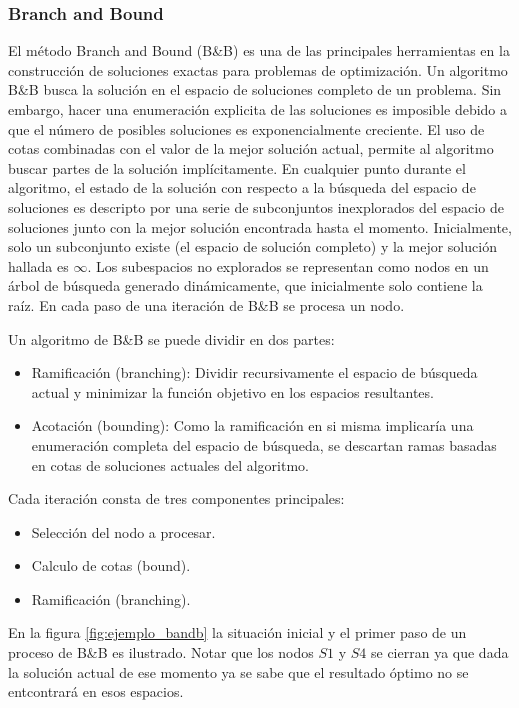 \documentclass[10pt, a4paper]{article}
\theoremstyle{definition}
\begin{document}
\subsubsection{Branch and Bound}
El método Branch and Bound (B\&B) es una de las principales herramientas en la construcción de soluciones exactas para problemas de optimización.
Un algoritmo B\&B busca la solución en el espacio de soluciones completo de un problema.
Sin embargo, hacer una enumeración explicita de las soluciones es imposible debido a que el número de posibles soluciones es exponencialmente creciente.
El uso de cotas combinadas con el valor de la mejor solución actual, permite al algoritmo buscar partes de la solución implícitamente.
En cualquier punto durante el algoritmo, el estado de la solución con respecto a la búsqueda del espacio de soluciones es descripto por una serie de subconjuntos inexplorados del espacio de soluciones junto con la mejor solución encontrada hasta el momento.
Inicialmente, solo un subconjunto existe (el espacio de solución completo) y la mejor solución hallada es $\infty$. 
Los subespacios no explorados se representan como nodos en un árbol de búsqueda generado dinámicamente, que inicialmente solo contiene la raíz. 
En cada paso de una iteración de B\&B se procesa un nodo.

Un algoritmo de B\&B se puede dividir en dos partes:

\begin{itemize}
  \item Ramificación (branching): Dividir recursivamente el espacio de búsqueda actual y minimizar la función objetivo en los espacios resultantes.
  \item Acotación (bounding): Como la ramificación en si misma implicaría una enumeración completa del espacio de búsqueda, se descartan ramas basadas en cotas de soluciones actuales del algoritmo.
\end{itemize}

Cada iteración consta de tres componentes principales:
 
\begin{itemize}
  \item Selección del nodo a procesar.
  \item Calculo de cotas (bound).
  \item Ramificación (branching).
\end{itemize}

En la figura \ref{fig:ejemplo_bandb} la situación inicial y el primer paso de un proceso de B\&B es ilustrado. Notar que los nodos $S1$ y $S4$ se cierran ya que dada la solución actual de ese momento ya se sabe que el resultado óptimo no se entcontrará en esos espacios.
\end{document}
